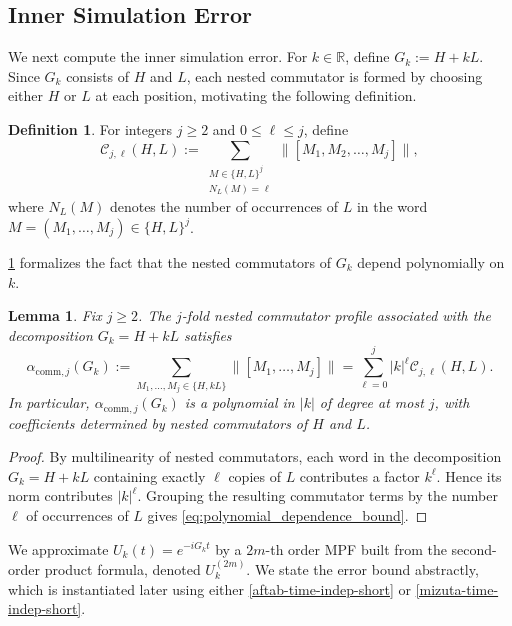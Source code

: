 \documentclass[10pt,reqno]{article}
\numberwithin{equation}{section}
\theoremstyle{plain}
\newtheorem{lem}[thm]{Lemma}
\theoremstyle{definition}
\newtheorem{defn}[thm]{Definition}
\begin{document}
\subsection{Inner Simulation Error}\label{inner-sim-subsub}
We next compute the inner simulation error. For \(k\in\mathbb{R}\), define \(G_k:=H+kL\). Since \(G_k\) consists of \(H\) and \(L\), each nested commutator is formed by choosing either \(H\) or \(L\) at each position, motivating the following definition.

\begin{defn}\label{comm-decouple}
For integers \( j \ge 2 \) and \( 0 \le \ell \le j \), define
\begin{equation}
\mathcal
C_{j,\ell}(H,L) := \sum_{\substack{M \in \{H,L\}^{j}\\ N_L(M)=\ell}} \|[M_1,M_2,\dots,M_j] \|,
\label{eq:def_Cql}
\end{equation}
where \( N_L(M) \) denotes the number of occurrences of \( L \) in the word \( M=(M_1,\dots,M_j) \in \{H,L\}^{j} \).
\end{defn}

\cref{lem:polynomial_dependence_k} formalizes the fact that the nested commutators of \(G_k\) depend polynomially on \(k\). %

\begin{lem}
\label{lem:polynomial_dependence_k}
Fix \( j \ge 2 \).  The \(j\)-fold nested commutator profile associated with the decomposition \(G_k=H+kL\) satisfies
\begin{equation}\label{eq:polynomial_dependence_bound}
\alpha_{\mathrm{comm},j}(G_k) := \sum_{M_1,\ldots,M_j \in \{H,kL\}} \|[M_1,\ldots,M_j]\| = \sum_{\ell=0}^{j} |k|^{\ell}\mathcal{C}_{j,\ell}(H,L).
\end{equation}
In particular, $\alpha_{\mathrm{comm},j}(G_k)$ is a polynomial in \(|k|\) of degree at most \(j\), with coefficients determined by nested commutators of \(H\) and \(L\).
\end{lem}

\begin{proof} By multilinearity of nested commutators, each word in the decomposition \(G_k=H+kL\) containing exactly \(\ell\) copies of \(L\) contributes a factor \(k^\ell\). Hence its norm contributes \(|k|^\ell\). Grouping the resulting commutator terms by the number \(\ell\) of occurrences of \(L\) gives \cref{eq:polynomial_dependence_bound}.  \end{proof}

We approximate $U_k(t)=e^{-iG_kt}$ by a $2m$-th order MPF built from the second-order product formula, denoted $U_k^{(2m)}$. We state the error bound abstractly, which is instantiated later using either \cref{aftab-time-indep-short} or \cref{mizuta-time-indep-short}.
\end{document}

